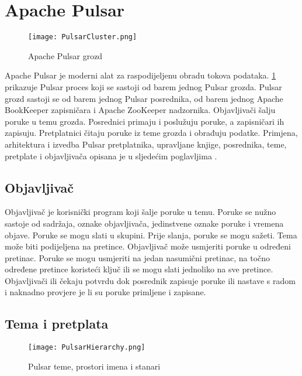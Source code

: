 \documentclass[utf8, diplomski, lmodern, numeric]{fer}
\begin{document}
\section{Apache Pulsar}

\begin{figure}[H]
    \centering
    \texttt{[image: PulsarCluster.png]}
    \caption{Apache Pulsar grozd}
    \label{fig:pulsar-cluster}
\end{figure}

Apache Pulsar je moderni alat za raspodijeljenu obradu tokova podataka. \ref{fig:pulsar-cluster} prikazuje Pulsar proces koji se sastoji od barem jednog Pulsar grozda. Pulsar grozd sastoji se od barem jednog Pulsar posrednika, od barem jednog Apache BookKeeper zapisničara i Apache ZooKeeper nadzornika. Objavljivači šalju poruke u temu grozda. Posrednici primaju i poslužuju poruke, a zapisničari ih zapisuju. Pretplatnici čitaju poruke iz teme grozda i obrađuju podatke. Primjena, arhitektura i izvedba Pulsar pretplatnika, upravljane knjige, posrednika, teme, pretplate i objavljivača opisana je u sljedećim poglavljima \citep{pulsar-docs} \citep{pulsar-streamlio-1} \citep{pulsar-streamlio-2} \citep{pulsar-streamlio-intro}.

\subsection{Objavljivač}
Objavljivač je korisnički program koji šalje poruke u temu. Poruke se nužno sastoje od sadržaja, oznake objavljivača, jedinstvene oznake poruke i vremena objave. Poruke se mogu slati u skupini. Prije slanja, poruke se mogu sažeti. Tema može biti podijeljena na pretince. Objavljivač može usmjeriti poruke u određeni pretinac. Poruke se mogu usmjeriti na jedan nasumični pretinac, na točno određene pretince koristeći ključ ili se mogu slati jednoliko na sve pretince. Objavljivači ili čekaju potvrdu dok posrednik zapisuje poruke ili nastave s radom i naknadno provjere je li su poruke primljene i zapisane.

\subsection{Tema i pretplata}

\begin{figure}[H]
    \centering
    \texttt{[image: PulsarHierarchy.png]}
    \caption{Pulsar teme, prostori imena i stanari}
    \label{fig:pulsar-hierarchy}
\end{figure}
\end{document}
